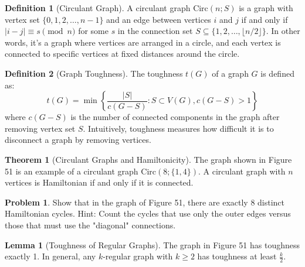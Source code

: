 \documentclass{article}
\theoremstyle{definition}
\newtheorem{problem}{Problem}
\newtheorem{theorem}{Theorem}
\newtheorem{lemma}{Lemma}
\newtheorem{definition}{Definition}
\begin{document}
\begin{definition}[Circulant Graph]
A circulant graph $\text{Circ}(n; S)$ is a graph with vertex set $\{0, 1, 2, \ldots, n-1\}$ and an edge between vertices $i$ and $j$ if and only if $|i - j| \equiv s \pmod{n}$ for some $s$ in the connection set $S \subseteq \{1, 2, \ldots, \lfloor n/2 \rfloor\}$. In other words, it's a graph where vertices are arranged in a circle, and each vertex is connected to specific vertices at fixed distances around the circle.
\end{definition}

\begin{definition}[Graph Toughness]
The toughness $t(G)$ of a graph $G$ is defined as:
\[t(G) = \min \left\{\frac{|S|}{c(G-S)} : S \subset V(G), c(G-S) > 1 \right\}\]
where $c(G-S)$ is the number of connected components in the graph after removing vertex set $S$. Intuitively, toughness measures how difficult it is to disconnect a graph by removing vertices.
\end{definition}

\begin{theorem}[Circulant Graphs and Hamiltonicity]
The graph shown in Figure 51 is an example of a circulant graph $\text{Circ}(8;\{1,4\})$. A circulant graph with $n$ vertices is Hamiltonian if and only if it is connected.
\end{theorem}

\begin{problem}
Show that in the graph of Figure 51, there are exactly 8 distinct Hamiltonian cycles. Hint: Count the cycles that use only the outer edges versus those that must use the "diagonal" connections.
\end{problem}

\begin{lemma}[Toughness of Regular Graphs]
The graph in Figure 51 has toughness exactly 1. In general, any $k$-regular graph with $k \geq 2$ has toughness at least $\frac{k}{2}$.
\end{lemma}
\end{document}
